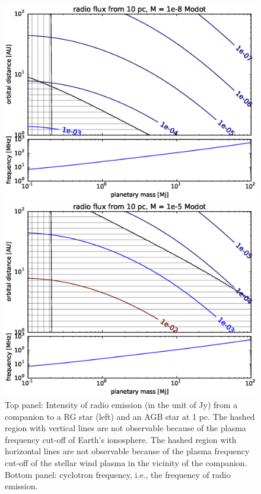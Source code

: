 \documentclass{emulateapj}
\begin{document}
\begin{figure}[bp]
 \begin{minipage}{0.5\hsize}
  \begin{center}
   \includegraphics[width=\hsize]{radio_emission_Mdot1e-8.eps}
  \end{center}
 \end{minipage}
 \begin{minipage}{0.5\hsize}
  \begin{center}
   \includegraphics[width=\hsize]{radio_emission_Mdot1e-5.eps}
  \end{center} 
 \end{minipage}
   \caption{Top panel: Intensity of radio emission (in the unit of Jy) from a companion to a RG star (left) and an AGB star at 1 pc. The hashed region with vertical lines are not observable because of the plasma frequency cut-off of Earth's ionosphere. The hashed region with horizontal lines are not observable because of the plasma frequency cut-off of the stellar wind plasma in the vicinity of the companion. Bottom panel: cyclotron frequency, i.e., the frequency of radio emission. }
  \label{fig:two}
\end{figure}
\end{document}
